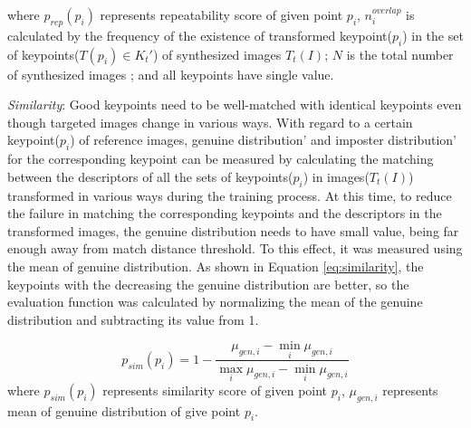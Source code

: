 \noindent
where $p_{rep}(p_i)$ represents repeatability score of given point $p_i$, $n_i^{overlap}$ is calculated by the frequency of the existence of transformed keypoint($p_i$) in the set of keypoints($T(p_i)\in K_t'$) of synthesized images $T_t(I)$; $N$ is the total number of synthesized images ; and all keypoints have single value. 


\textit{Similarity}: Good keypoints need to be well-matched with identical keypoints even though targeted images change in various ways. With regard to a certain keypoint($p_i$) of reference images, genuine distribution' and imposter distribution' for the corresponding keypoint can be measured by calculating the matching between the descriptors of all the sets of keypoints($p_i$) in images($T_t(I)$) transformed in various ways  during the training process. At this time, to reduce the failure in matching the corresponding keypoints and the descriptors in the transformed images, the genuine distribution needs to have small value, being far enough away from match distance threshold. To this effect, it was measured using the mean of genuine distribution. As shown in Equation \eqref{eq:similarity}, the keypoints with the decreasing the genuine distribution are better, so the evaluation function was calculated by normalizing the mean of the genuine distribution and subtracting its value from 1.  

\begin{equation} \label{eq:similarity}
p_{sim}(p_i) = 1 - \frac{\mu_{gen,i} - \min_i \mu_{gen,i}}{\max_i \mu_{gen, i} - \min_i \mu_{gen,i}}
\end{equation}	
where $p_{sim}(p_i)$ represents similarity score of given point $p_i$, $\mu_{gen, i}$ represents mean of genuine distribution of give point $p_i$. 


